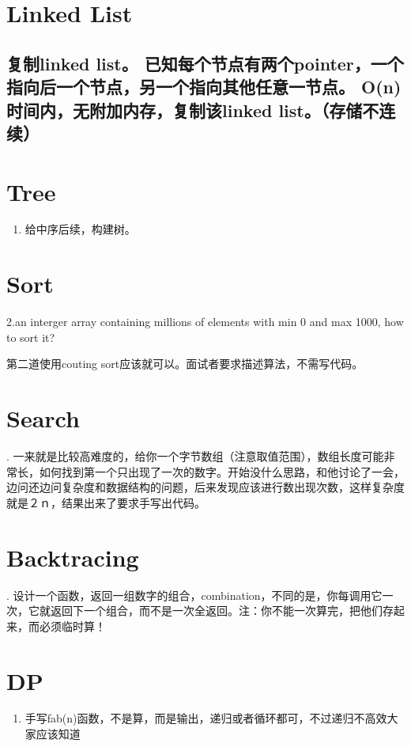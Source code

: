 \documentclass[12pt]{book}
\begin{document}
\chapter{Linked List}
\label{sec-3}
\section{复制linked list。 已知每个节点有两个pointer，一个指向后一个节点，另一个指向其他任意一节点。 O(n)时间内，无附加内存，复制该linked list。（存储不连续）}
\label{sec-3-1}

\chapter{Tree}
\label{sec-4}
\begin{enumerate}
\item 给中序后续，构建树。
\end{enumerate}

\chapter{Sort}
\label{sec-5}
2.an interger array containing millions of elements with min 0 and max 1000,
how to sort it?

第二道使用couting sort应该就可以。面试者要求描述算法，不需写代码。

\chapter{Search}
\label{sec-6}
. 一来就是比较高难度的，给你一个字节数组（注意取值范围），数组长度可能非常长，如何找到第一个只出现了一次的数字。开始没什么思路，和他讨论了一会，边问还边问复杂度和数据结构的问题，后来发现应该进行数出现次数，这样复杂度就是２ｎ，结果出来了要求手写出代码。

\chapter{Backtracing}
\label{sec-7}
. 设计一个函数，返回一组数字的组合，combination，不同的是，你每调用它一次，它就返回下一个组合，而不是一次全返回。注：你不能一次算完，把他们存起来，而必须临时算！

\chapter{DP}
\label{sec-8}
\begin{enumerate}
\item 手写fab(n)函数，不是算，而是输出，递归或者循环都可，不过递归不高效大家应该知道
\end{enumerate}
\end{document}
